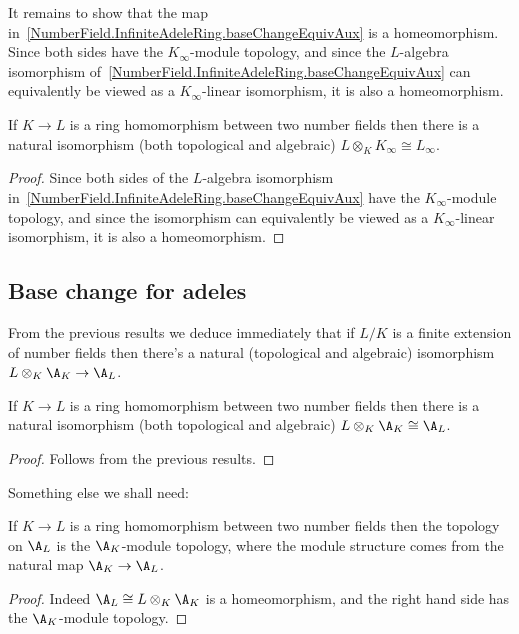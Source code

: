 It remains to show that the map in~\ref{NumberField.InfiniteAdeleRing.baseChangeEquivAux} is a
homeomorphism.
Since both sides have the $K_{\infty}$-module topology, and since the $L$-algebra isomorphism
of~\ref{NumberField.InfiniteAdeleRing.baseChangeEquivAux} can equivalently be viewed as a
$K_{\infty}$-linear isomorphism, it is also a homeomorphism.

\begin{theorem}
  \label{NumberField.InfiniteAdeleRing.baseChangeEquiv}
  \leanok
  If $K\to L$ is a ring homomorphism between two number fields then there is a natural isomorphism
  (both topological and algebraic) $L\otimes_KK_\infty\cong L_\infty$.
\end{theorem}
\begin{proof}
  Since both sides of the $L$-algebra isomorphism
  in~\ref{NumberField.InfiniteAdeleRing.baseChangeEquivAux} have the $K_{\infty}$-module topology,
  and since the isomorphism can equivalently be viewed as a $K_{\infty}$-linear isomorphism,
  it is also a homeomorphism.
\end{proof}


\subsection{Base change for adeles}

From the previous results we deduce immediately that if $L/K$ is a finite extension
of number fields then there's a natural (topological and algebraic) isomorphism
$L\otimes_K\A_K\to \A_L$.

\begin{theorem}
  \label{NumberField.AdeleRing.baseChangeEquiv}
  If $K\to L$ is a ring homomorphism between two number fields then there is a natural isomorphism
  (both topological and algebraic) $L\otimes_K\A_K\cong\A_L$.
\end{theorem}
\begin{proof}
  Follows from the previous results.
\end{proof}

Something else we shall need:

\begin{theorem}
  \label{NumberField.AdeleRing.baseChange_moduleTopology}
  If $K\to L$ is a ring homomorphism between two number fields then the topology on $\A_L$
  is the $\A_K$-module topology, where the module structure comes from the
  natural map $\A_K\to\A_L$.
\end{theorem}
\begin{proof}
  Indeed $\A_L\cong L\otimes_K\A_K$ is a homeomorphism, and
  the right hand side has the $\A_K$-module topology.
\end{proof}

